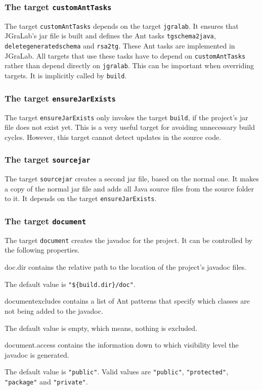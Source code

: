 \documentclass[a4paper,twoside,11pt,bibtotoc]{article}
\begin{document}
\subsubsection{The target \texttt{customAntTasks}}
The target \texttt{customAntTasks} depends on the target \texttt{jgralab}.
It ensures that JGraLab's jar file is built and defines the Ant tasks \texttt{tgschema2java}, \texttt{deletegeneratedschema} and \texttt{rsa2tg}.
These Ant tasks are implemented in JGraLab.
All targets that use these tasks have to depend on \texttt{customAntTasks} rather than depend directly on \texttt{jgralab}.
This can be important when overriding targets.
It is implicitly called by \texttt{build}.

\subsubsection{The target \texttt{ensureJarExists}}
The target \texttt{ensureJarExists} only invokes the target \texttt{build}, if the project's jar file does not exist yet.
This is a very useful target for avoiding unnecessary build cycles.
However, this target cannot detect updates in the source code.%

\subsubsection{The target \texttt{sourcejar}}
The target \texttt{sourcejar} creates a second jar file, based on the normal one.
It makes a copy of the normal jar file and adds all Java source files from the source folder to it.
It depends on the target \texttt{ensureJarExists}.

\subsubsection{The target \texttt{document}}
The target \texttt{document} creates the javadoc for the project.
It can be controlled by the following properties.
\begin{description*}
	\item[doc.dir] contains the relative path to the location of the project's javadoc files.\par The default value is \texttt{"\$\{build.dir\}/doc"}.
	\item[documentexcludes] contains a list of Ant patterns that specify which classes are not being added to the javadoc.\par The default value is empty, which means, nothing is excluded.
	\item[document.access] contains the information down to which visibility level the javadoc is generated.\par The default value is \texttt{"public"}. Valid values are \texttt{"public"}, \texttt{"protected"}, \texttt{"package"} and \texttt{"private"}.
\end{description*}
\end{document}
